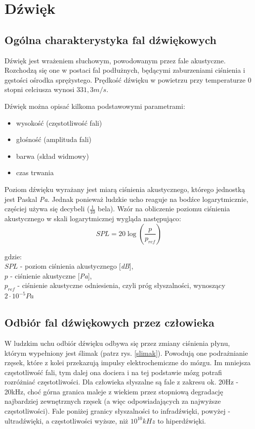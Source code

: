 \chapter{Dźwięk}
\label{cha:dwiek}

\section{Ogólna charakterystyka fal dźwiękowych}
Dźwięk jest wrażeniem słuchowym, powodowanym przez fale akustyczne. Rozchodzą się one w postaci fal podłużnych, będącymi zaburzeniami ciśnienia i gęstości ośrodka sprężystego\cite{FaleAkustyczne}. Prędkość dźwięku w powietrzu przy temperaturze 0 stopni celciusza wynosi $ 331,3m/s $.

Dźwięk można opisać kilkoma podstawowymi parametrami:

\begin{itemize}
	\item wysokość (częstotliwość fali)
	\item głośność (amplituda fali)
	\item barwa (skład widmowy)
	\item czas trwania
\end{itemize}

Poziom dźwięku wyrażany jest miarą ciśnienia akustycznego, którego jednostką jest Paskal \textit{Pa}. Jednak ponieważ ludzkie ucho reaguje na bodźce logarytmicznie, częściej używa się decybeli ($\frac{1}{10}$ bela). Wzór na obliczenie poziomu ciśnienia akustycznego w skali logarytmicznej wygląda następująco\cite{CisnienieAkustyczne}:
\begin{equation}
SPL = 20\log{(\frac{p}{p_{ref}})}
\end{equation}

gdzie: \\
\indent$SPL$ - poziom ciśnienia akustycznego [\textit{dB}], \\
\indent$p$ - ciśnienie akustyczne [\textit{Pa}], \\
\indent$p_{ref}$ - ciśnienie akustyczne odniesienia, czyli próg słyszalności, wynoszący $2\cdot10^{-5} Pa$ 


\section{Odbiór fal dźwiękowych przez człowieka}
W ludzkim uchu odbiór dźwięku odbywa się przez zmiany ciśnienia płynu, którym wypełniony jest ślimak (patrz rys. \ref{slimak}). Powodują one podrażnianie rzęsek, które z kolei przekazują impulsy elektrochemiczne do mózgu. Im mniejsza częstotliwość fali, tym dalej ona dociera i na tej podstawie mózg potrafi rozróżniać częstotliwości. Dla człowieka słyszalne są fale z zakresu ok. 20Hz - 20kHz, choć górna granica maleje z wiekiem przez stopniową degradację najbardziej zewnętrznych rzęsek (a więc odpowiadających za najwyższe częstotliwości)\cite{JakSlyszymy}. 
Fale poniżej granicy słyszalności to infradźwięki, powyżej - ultradźwięki, a częstotliwości wyższe, niż $10^{10}kHz$ to hiperdźwięki.

